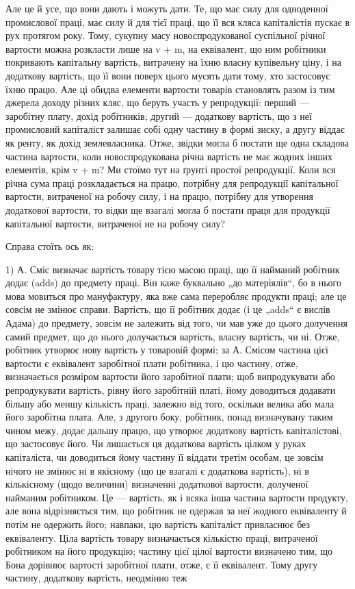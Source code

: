 \parcont{}  %
Але це й усе, що вони дають і можуть дати. Те, що має силу для одноденної промислової праці, має
силу й для тієї праці, що її вся кляса капіталістів пускає в рух протягом року. Тому, сукупну масу
новоспродукованої суспільної річної вартости можна розкласти лише на v + m, на еквівалент, що ним
робітники покривають капітальну вартість, витрачену на їхню власну купівельну ціну, і на додаткову
вартість, що її вони поверх цього мусять дати тому, хто застосовує їхню працю. Але ці обидва
елементи вартости товарів становлять разом із тим джерела доходу різних кляс, що беруть участь у
репродукції: перший — заробітну плату, дохід робітників; другий — додаткову вартість, що з неї
промисловий капіталіст залишає собі одну частину в формі зиску, а другу віддає як ренту, як дохід
землевласника. Отже, звідки могла б постати ще одна складова частина вартости, коли новоспродукована
річна вартість не має жодних інших елементів, крім v + m? Ми стоїмо тут на ґрунті простої
репродукції. Коли вся річна сума праці розкладається на працю, потрібну для репродукції капітальної
вартости, витраченої на робочу силу, і на працю, потрібну для утворення додаткової вартости, то
відки ще взагалі могла б постати праця для продукції капітальної вартости, витраченої не на робочу
силу?

Справа стоїть ось як:

1) А. Сміс визначає вартість товару тією масою праці, що її найманий робітник додає (adds) до
предмету праці. Він каже буквально „до матеріялів“, бо в нього мова мовиться про мануфактуру, яка
вже сама переробляє продукти праці; але це совсім не змінює справи. Вартість, що її робітник додає
(і це „adds“ є вислів Адама) до предмету, зовсім
не залежить від того, чи мав уже до цього долучення самий предмет, що до нього долучається вартість,
власну вартість, чи ні. Отже, робітник утворює нову вартість у товаровій формі; за А. Смісом частина
цієї вартости є еквівалент заробітної плати робітника, і цю частину, отже, визначається розміром
вартости його заробітної плати; щоб випродукувати або репродукувати вартість, рівну його заробітній
платі, йому
доводиться додавати більшу або меншу кількість праці, залежно від того, оскільки велика або мала
його заробітна плата. Але, з другого боку, робітник, понад визначувану таким чином межу, додає
дальшу працю, що утворює додаткову вартість капіталістові, що застосовує його. Чи лишається ця
додаткова вартість цілком у руках капіталіста, чи доводиться йому частину її віддати третім особам,
це зовсім нічого не змінює ні в якісному (що це взагалі є додаткова вартість), ні в кількісному
(щодо величини) визначенні додаткової вартости, долученої найманим робітником. Це — вартість, як і
всяка інша частина вартости продукту, але вона відрізняється тим, що робітник не одержав за неї
жодного еквіваленту й потім не одержить його; навпаки, цю вартість капіталіст привласнює без
еквіваленту. Ціла вартість товару визначається кількістю
праці, витраченої робітником на його продукцію; частину цієї цілої вартости визначено тим, що Бона
дорівнює вартості заробітної плати, отже, є її еквівалент. Тому другу частину, додаткову вартість,
неодмінно теж
\parbreak{}  %
